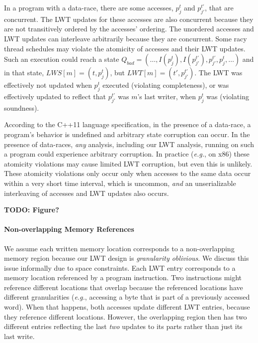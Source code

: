 \documentclass[preprint,9pt]{sigplanconf}
\newcommand{\lwt}{LWT\xspace}
\begin{document}
In a program with a data-race, there are some accesses, $p^{t}_{j}$ and
$p^{t'}_{j'}$, that are concurrent.  The \lwt updates for these accesses are
also concurrent because they are not transitively ordered by the accesses' ordering.  The unordered accesses and \lwt updates can interleave arbitrarily
because they are concurrent.  Some racy thread schedules may violate the
atomicity of accesses and their \lwt updates.  Such an execution could reach a
state $Q_{bad} = (\ldots, I(p^{t}_{j}), I(p^{t'}_{j'}), p^{t'}_{j'}, p^{t}_{j},
\ldots)$ and in that state, $LWS[m] = (t,p^{t}_{j})$, but $LWT[m] =
(t',p^{t'}_{j'})$.  The \lwt was effectively not updated when $p^{t}_{j}$
executed (violating completeness), or was effectively updated to reflect that
$p^{t'}_{j'}$ was $m$'s last writer, when $p^{t}_{j}$ was (violating
soundness).    

According to the C++11 language specification, in the presence of a data-race,
a program's behavior is undefined and arbitrary state corruption can occur.  In
the presence of data-races, {\em any} analysis, including our \lwt analysis,
running on such a program could experience arbitrary corruption.  In practice
({\em e.g.}, on x86) these atomicity violations may cause limited \lwt
corruption, but even this is unlikely.  These atomicity violations only occur
only when accesses to the same data occur within a very short time interval,
which is uncommon, {\em and} an unserializable interleaving of accesses and
\lwt updates also occurs.

{\bf TODO: Figure?}




\paragraph{Non-overlapping Memory References} 
We assume each written memory location corresponds to a non-overlapping memory
region because our \lwt design is {\em granularity oblivious}.  We discuss this
issue informally due to space constraints.  Each \lwt entry corresponds to a
memory location referenced by a program instruction.  Two instructions might
reference different locations that overlap because the referenced locations
have different granularities ({\em e.g.}, accessing a byte that is part of a
previously accessed word).  When that happens, both accesses update different
\lwt entries, because they reference different locations.  However, the
overlapping region then has two different entries reflecting the last {\em two}
updates to its parts rather than just its last write.
\end{document}
